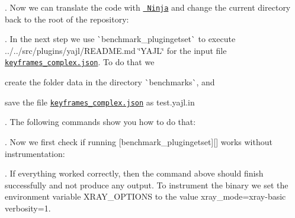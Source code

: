 \begin{DoxyCode}{0}
\end{DoxyCode}


. Now we can translate the code with \href{https://ninja-build.org}{\texttt{ Ninja}} and change the current directory back to the root of the repository\+:


\begin{DoxyCode}{0}
\end{DoxyCode}


. In the next step we use \`{}benchmark\+\_\+plugingetset\`{} to execute ../../src/plugins/yajl/\+R\+E\+A\+D\+ME.md \char`\"{}\+Y\+A\+J\+L\char`\"{} for the input file \href{../../src/plugins/yajl/yajl/keyframes_complex.json}{\texttt{ {\ttfamily keyframes\+\_\+complex.\+json}}}. To do that we


\begin{DoxyEnumerate}
\item create the folder {\ttfamily data} in the directory \`{}benchmarks\`{}, and
\item save the file \href{../../src/plugins/yajl/yajl/keyframes_complex.json}{\texttt{ {\ttfamily keyframes\+\_\+complex.\+json}}} as {\ttfamily test.\+yajl.\+in}
\end{DoxyEnumerate}

. The following commands show you how to do that\+:


\begin{DoxyCode}{0}
\end{DoxyCode}


. Now we first check if running \mbox{[}{\ttfamily benchmark\+\_\+plugingetset}\mbox{]}\mbox{[}\mbox{]} works without instrumentation\+:


\begin{DoxyCode}{0}
\end{DoxyCode}


. If everything worked correctly, then the command above should finish successfully and not produce any output. To instrument the binary we set the environment variable {\ttfamily X\+R\+A\+Y\+\_\+\+O\+P\+T\+I\+O\+NS} to the value {\ttfamily xray\+\_\+mode=xray-\/basic verbosity=1}.


